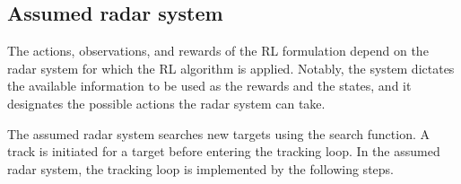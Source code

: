 \documentclass[english, 12pt, a4paper, elec, utf8, a-1b, online]{aaltothesis}
\numberwithin{equation}{section}
\begin{document}
\subsection{Assumed radar system} \label{sec:system_description}

The actions, observations, and rewards of the RL formulation depend on the radar system for which the RL algorithm is applied.
Notably, the system dictates the available information to be used as the rewards and the states, and it designates the possible actions the radar system can take.
 
The assumed radar system searches new targets using the search function. 
A track is initiated for a target before entering the tracking loop. 
In the assumed radar system, the tracking loop is implemented by the following steps.
\end{document}
